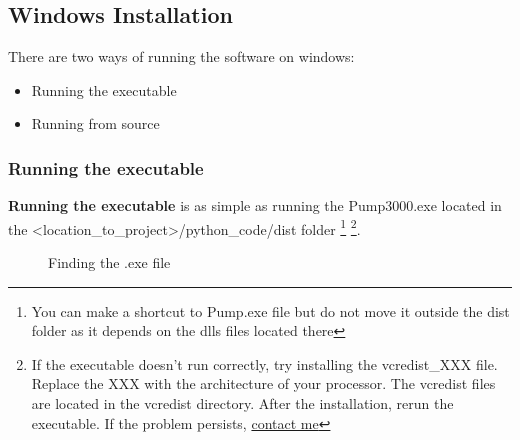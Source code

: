 \documentclass[letterpaper,10pt,english]{sphinxmanual}
\begin{document}
\subsection{Windows Installation}
\label{installation:running-it}\label{installation:windows-installation}
There are two ways of running the software on windows:
\begin{itemize}
\item {} 
Running the executable

\item {} 
Running from source

\end{itemize}


\subsubsection{Running the executable}
\label{installation:running-the-executable}
\textbf{Running the executable} is as simple as running the Pump3000.exe
located in the \textless{}location\_to\_project\textgreater{}/python\_code/dist folder \footnote{
You can make a shortcut to Pump.exe file but do not move it outside
the dist folder as it depends on the dlls files located there
} \footnote{
If the executable doesn't run correctly, try installing the vcredist\_XXX file.
Replace the XXX with the architecture of your processor.
The vcredist files are located in the vcredist directory.
After the installation, rerun the executable.
If the problem persists, \href{http://www.github.com/bergercookie}{contact me}
}.
\begin{figure}[htbp]
\centering
\capstart

\caption{Finding the .exe file}\end{figure}
\end{document}
